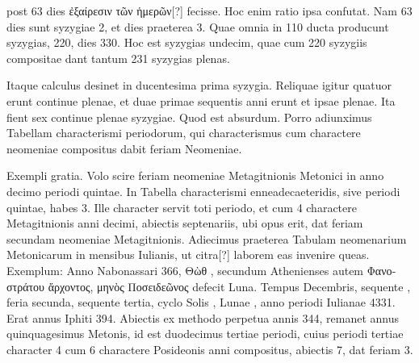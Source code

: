 post 63 dies \textgreek{ἐξαίρεσιν τῶν ἡμερῶν[?]} fecisse.
Hoc enim ratio ipsa confutat.
Nam 63 dies sunt syzygiae 2, et dies praeterea 3.
Quae omnia
in 110 ducta producunt syzygias, 220, dies 330.
Hoc est syzygias
undecim, quae cum 220 syzygiis compositae dant tantum 231
syzygias plenas.
\begin{table}[htbp]

\end{table}
\begin{table}[htbp]

\end{table}
\begin{table}[htbp]

\end{table}


Itaque calculus desinet in ducentesima prima syzygia.
Reliquae igitur
quatuor erunt continue plenae, et duae
primae sequentis anni erunt et ipsae plenae.
Ita fient sex continue plenae syzygiae.
Quod est absurdum.
Porro adiunximus Tabellam
characterismi periodorum, qui characterismus
cum charactere neomeniae compositus dabit feriam
Neomeniae.


Exempli gratia.
Volo scire feriam neomeniae Metagitnionis
Metonici in anno decimo periodi quintae.
In Tabella
characterismi enneadecaeteridis, sive periodi quintae, habes
3.
Ille character servit toti periodo, et cum 4 charactere Metagitnionis
anni decimi, abiectis septenariis, ubi opus erit, dat
feriam secundam neomeniae Metagitnionis.
Adiecimus praeterea
Tabulam neomenarium Metonicarum in mensibus Iulianis,
ut citra[?] laborem eas invenire queas.
Exemplum: Anno
Nabonassari 366, \textgreek{Θὼθ },
 secundum Athenienses autem \textgreek{Φανοστράτου
ἄρχοντος, μηνὸς Ποσειδεῶνος} defecit Luna.
Tempus
 Decembris, sequente , feria secunda, sequente
tertia, cyclo Solis , Lunae , anno periodi Iulianae
4331.
Erat annus Iphiti 394.
Abiectis ex methodo perpetua annis
344, remanet annus quinquagesimus Metonis, id est duodecimus
tertiae periodi, cuius periodi tertiae character 4 cum 6 charactere
Posideonis anni  compositus, abiectis 7, dat feriam 3.

